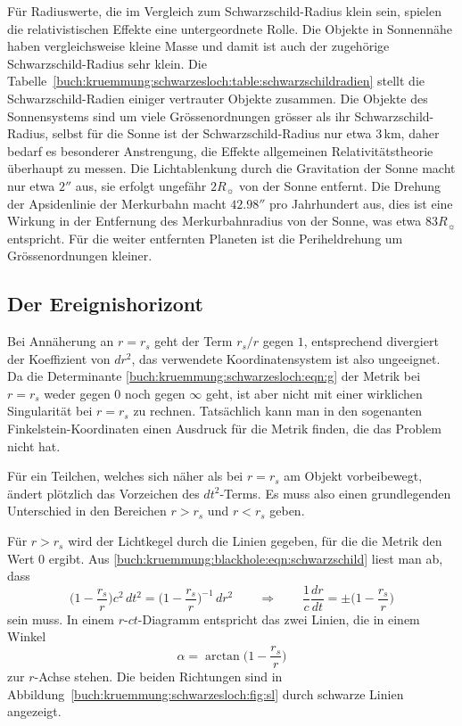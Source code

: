 Für Radiuswerte, die im Vergleich zum Schwarzschild-Radius klein sein,
spielen die relativistischen Effekte eine untergeordnete Rolle.
Die Objekte in Sonnennähe haben vergleichsweise kleine Masse und damit
ist auch der zugehörige Schwarzschild-Radius sehr klein.
Die Tabelle~\ref{buch:kruemmung:schwarzesloch:table:schwarzschildradien}
stellt die Schwarzschild-Radien einiger vertrauter Objekte zusammen.
Die Objekte des Sonnensystems sind um viele Grössenordnungen grösser
als ihr Schwarzschild-Radius, selbst für die Sonne ist der
Schwarzschild-Radius nur etwa 3\,km, daher bedarf es besonderer 
Anstrengung, die Effekte allgemeinen Relativitätstheorie überhaupt
zu messen.
Die Lichtablenkung durch die Gravitation der Sonne macht nur etwa
$2''$ aus, sie erfolgt ungefähr $2R_{\sun}$ von der Sonne entfernt.
Die Drehung der Apsidenlinie der Merkurbahn macht $42.98''$ pro
Jahrhundert aus, dies ist eine Wirkung in der Entfernung des
Merkurbahnradius von der Sonne, was etwa $83R_{\sun}$ entspricht.
Für die weiter entfernten Planeten ist die Periheldrehung um Grössenordnungen
kleiner.

\subsection{Der Ereignishorizont}
Bei Annäherung an $r=r_s$ geht der Term $r_s/r$ gegen $1$, entsprechend
divergiert der Koeffizient von $dr^2$,
das verwendete Koordinatensystem ist also ungeeignet.
Da die Determinante \eqref{buch:kruemmung:schwarzesloch:eqn:g}
der Metrik bei $r=r_s$ weder gegen $0$ noch
gegen $\infty$ geht, ist aber nicht mit einer wirklichen
Singularität bei $r=r_s$ zu rechnen.
Tatsächlich kann man in den sogenanten Finkelstein-Koordinaten
einen Ausdruck für die Metrik finden, die das Problem nicht hat.

Für ein Teilchen, welches sich näher als bei $r=r_s$ am Objekt
vorbeibewegt, ändert plötzlich das Vorzeichen des $dt^2$-Terms.
Es muss also einen grundlegenden Unterschied in den Bereichen
$r>r_s$ und $r<r_s$ geben.

Für $r>r_s$ wird der Lichtkegel durch die Linien gegeben, für
die die Metrik den Wert 0 ergibt.
%
Aus \eqref{buch:kruemmung:blackhole:eqn:schwarzschild} liest man
ab, dass 
\[
\biggl(1-\frac{r_s}{r}\biggr) c^2\, dt^2
=
\biggl(1-\frac{r_s}{r}\biggr)^{-1}\,dr^2
\qquad\Rightarrow\qquad
\frac1c\frac{dr}{dt}
=
\pm
\biggl(1-\frac{r_s}{r}\biggr)
\]
sein muss.
%
In einem $r$-$ct$-Diagramm entspricht das zwei Linien, die
in einem Winkel 
\[
\alpha = \arctan \biggl(1-\frac{r_s}{r}\biggr)
\]
zur $r$-Achse stehen.
Die beiden Richtungen sind in
Abbildung~\ref{buch:kruemmung:schwarzesloch:fig:sl}
durch schwarze Linien angezeigt.

